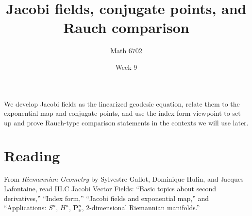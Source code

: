 \documentclass{article}
\title{Jacobi fields, conjugate points, and Rauch comparison}
\author{Math 6702}
\date{Week 9}
\begin{document}
\maketitle

We develop Jacobi fields as the linearized geodesic equation, relate them to the exponential map and conjugate points, and use the index form viewpoint to set up and prove Rauch-type comparison statements in the contexts we will use later.

\section*{Reading}
From \textit{Riemannian Geometry} by Sylvestre Gallot, Dominique Hulin, and Jacques Lafontaine, read \textsection III.C Jacobi Vector Fields: ``Basic topics about second derivatives,'' ``Index form,'' ``Jacobi fields and exponential map,'' and ``Applications: $S^n$, $H^n$, $\mathbf{P}^n_{\mathbb{R}}$, 2-dimensional Riemannian manifolds.''
\end{document}
